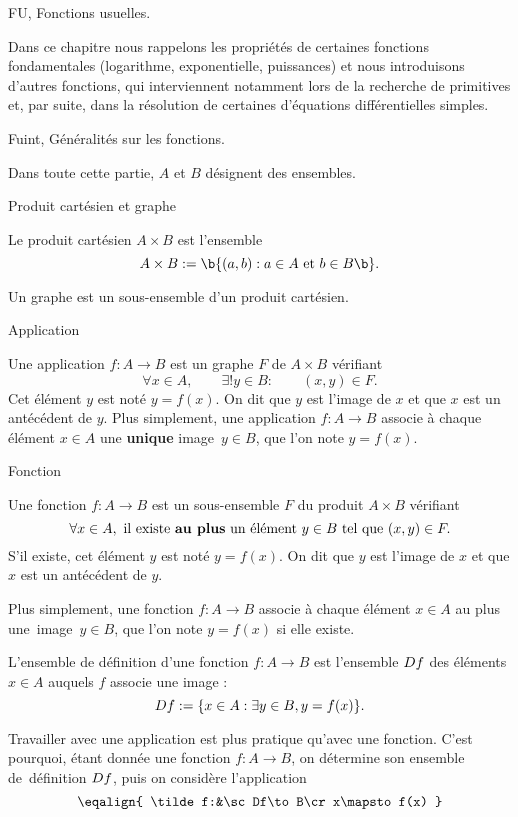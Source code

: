 \Chapter FU, Fonctions usuelles.

Dans ce chapitre nous rappelons les propriétés de certaines fonctions fondamentales (logarithme, exponentielle, puissances) 
et nous introduisons d'autres fonctions, qui interviennent notamment lors de la recherche de primitives et, par suite, dans la résolution 
de certaines d'équations différentielles simples.

\Section Fuint, Généralités sur les fonctions. 

\noindent
Dans toute cette partie, $A$ et $B$ désignent des ensembles. 
\bigskip

\Concept [] Produit cartésien et graphe

\Definition []  Le produit cartésien $A\times B$ est l'ensemble 
$$
A\times B:=\b\{(a,b):a\in A \mbox{ et }b\in B\b\}.
$$

\Definition []  Un graphe est un sous-ensemble d'un produit cartésien. 

\Concept [] Application

\Definition []  Une application $f:A\to B$ est un graphe $F$ de $A\times B$ vérifiant 
$$
\forall x\in A, \qquad \exists ! y\in B:\qquad (x,y)\in F.
$$
Cet élément $y$ est noté $y=f(x)$. On dit que $y$ est l'image de $x$ et que $x$ est un antécédent de $y$. 
\bigskip
\noindent
Plus simplement, une application $f:A\to B$ associe à chaque élément $x\in A$ une {\bf unique} image~$y\in B$, que l'on note $y=f(x)$. 
\bigskip

\Concept [] Fonction

\Definition []  Une fonction $f:A\to B$ est un sous-ensemble $F$ du produit $A\times B$ vérifiant 
$$
\forall x\in A, \mbox{ il existe {\bf au plus} un élément }y\in B\mbox{ tel que }(x,y)\in F. 
$$
S'il existe, cet élément $y$ est noté $y=f(x)$. On dit que $y$ est l'image de $x$ et que $x$ est un antécédent de $y$. 

\bigskip
\noindent
Plus simplement, une fonction $f:A\to B$ associe à chaque élément $x\in A$ au plus une~image~$y\in B$, que l'on note $y=f(x)$ si elle existe. 
\bigskip

\Definition []  L'ensemble de définition d'une fonction $f:A\to B$ est l'ensemble $\sc Df$ des éléments $x\in A$ auquels $f$ associe une image : 
$$
{
\sc Df:=\{x\in A:\exists y\in B, y=f(x)\}}.
$$


Travailler avec une application est plus pratique qu'avec une fonction. 
C'est pourquoi, étant donnée une fonction $f:A\to B$, on détermine son ensemble de~définition $\sc Df$, puis on considère l'application 
$$
\eqalign{
	\tilde f:&\sc Df\to B\cr
	x\mapsto f(x)
}
$$

